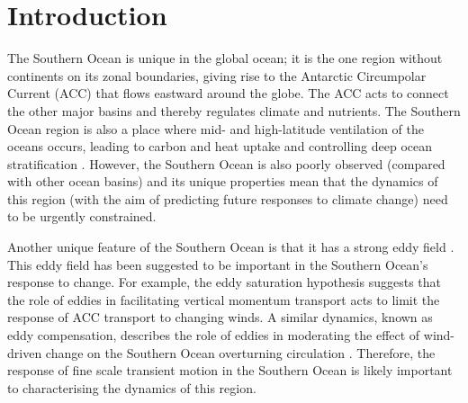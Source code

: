 \documentclass[linenumbers]{agujournal2019}
\begin{document}
%
%

\section{Introduction}

The Southern Ocean is unique in the global ocean; it is the one region without continents on its zonal boundaries, giving rise to the Antarctic Circumpolar Current (ACC) that flows eastward around the globe.
The ACC acts to connect the other major basins and thereby regulates climate and nutrients.
The Southern Ocean region is also a place where mid- and high-latitude ventilation of the oceans occurs, leading to carbon and heat uptake and controlling deep ocean stratification \citep{Rousselet2021, Morrison2022}.
However, the Southern Ocean is also poorly observed (compared with other ocean basins) and its unique properties mean that the dynamics of this region (with the aim of predicting future responses to climate change) need to be urgently constrained.

Another unique feature of the Southern Ocean is that it has a strong eddy field \citep{Fu2010}.
This eddy field has been suggested to be important in the Southern Ocean's response to change.
For example, the eddy saturation hypothesis \citep{Hallberg2006, Meredith-Hogg-2006, Munday2013, Constantinou2019} suggests that the role of eddies in facilitating vertical momentum transport acts to limit the response of ACC transport to changing winds.
A similar dynamics, known as eddy compensation, describes the role of eddies in moderating the effect of wind-driven change on the Southern Ocean overturning circulation \citep{Morrison2013a}.
Therefore, the response of fine scale transient motion in the Southern Ocean is likely important to characterising the dynamics of this region.
\end{document}
